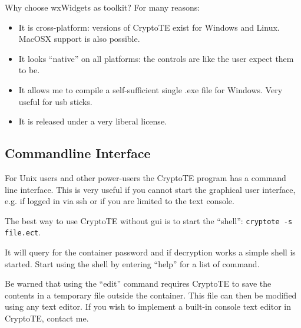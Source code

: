 \documentclass[a4paper,12pt,twoside]{article}
\begin{document}
Why choose wxWidgets as toolkit? For many reasons:

\begin{itemize}
  \item It is cross-platform: versions of CryptoTE exist for Windows and Linux. MacOSX support is also possible.
  \item It looks ``native'' on all platforms: the controls are like the user expect them to be.
  \item It allows me to compile a self-sufficient single .exe file for Windows. Very useful for usb sticks.
  \item It is released under a very liberal license.
\end{itemize}

\subsection{Commandline Interface}\label{Commandline}

For Unix users and other power-users the CryptoTE program has a command line interface. This is very useful if you cannot start the graphical user interface, e.g. if logged in via ssh or if you are limited to the text console.

The best way to use CryptoTE without gui is to start the ``shell'': \texttt{cryptote -s file.ect}.

It will query for the container password and if decryption works a simple shell is started. Start using the shell by entering ``help'' for a list of command.

Be warned that using the ``edit'' command requires CryptoTE to save the contents in a temporary file outside the container. This file can then be modified using any text editor. If you wish to implement a built-in console text editor in CryptoTE, contact me.
\end{document}
